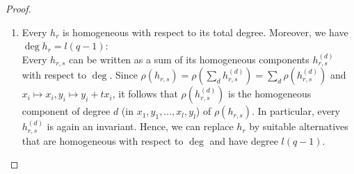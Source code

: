 \documentclass[reqno]{amsart}
\theoremstyle{definition}
\theoremstyle{plain}
\begin{document}
\begin{proof}
\begin{enumerate}
	\item \label{ges_deg} Every $h_r$ is homogeneous with respect to its total degree. Moreover, we have $\deg h_r = l(q-1)$: \\
	Every $h_{r,s}$ can be written as a sum of its homogeneous components $h_{r,s}^{(d)}$ with respect to $\deg$.
	Since $\rho(h_{r,s}) = \rho \left(\sum_d h_{r,s}^{(d)}\right) = \sum_d \rho \left(h_{r,s}^{(d)} \right)$ and $x_i \mapsto x_i, y_i \mapsto y_i + tx_i$, it follows that $\rho(h_{r,s}^{(d)})$ is the homogeneous component of degree $d$ (in $x_1, y_1, \dots, x_l, y_l$) of $\rho(h_{r,s})$. In particular, every $h_{r,s}^{(d)}$ is again an invariant. Hence, we can replace $h_r$ by suitable alternatives that are homogeneous with respect to $\deg$ and have degree $l(q-1)$.	
	

\end{enumerate}
\end{proof}
\end{document}
